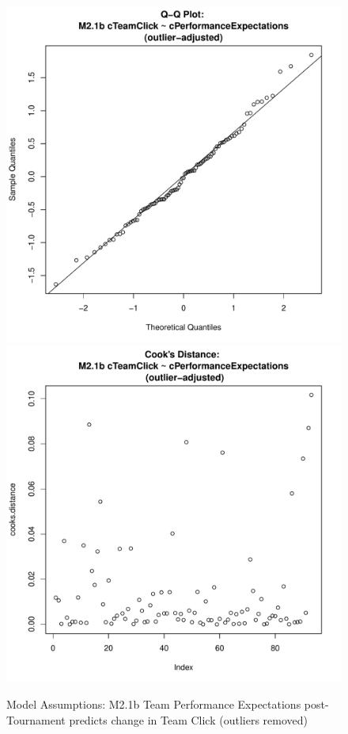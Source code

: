 {\begin{figure}[htbp]
  \includegraphics[scale =.4]{images/MLM21bOutQQNorm.pdf}
  \includegraphics[scale =.4]{images/MLM21bOutCooksD.pdf}
  \caption{Model Assumptions: M2.1b Team Performance Expectations post-Tournament predicts change in Team Click (outliers removed)}
  \label{fig:MLM21bOutAssumptions}
\end{figure}



}
